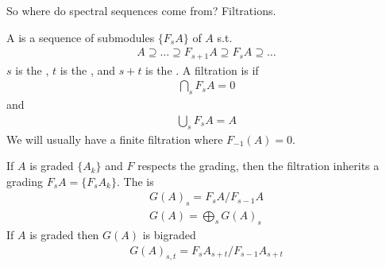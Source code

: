 \documentclass[12pt,class=article,crop=false]{standalone}
\begin{document}
So where do spectral sequences come from? Filtrations.

\begin{defn}
A   is a sequence of submodules $ \{F_sA\} $ of $ A$  s.t.\ 
\begin{align*}
	A \supseteq \ldots \supseteq F_{s+1} A \supseteq F_s A \supseteq \ldots
\end{align*}
$ s$ is the  , $ t$ is the  , and $ s+t$ is the  .   
A filtration is \allbold{convergent}  if
\begin{align*}
	\bigcap_{ s} F_sA = 0 
\end{align*}
and
\begin{align*}
	\bigcup_{ s} F_s A =A 
\end{align*}
We will usually have a finite filtration where $ F_{-1}(A) = 0$.

If $ A$ is graded  $ \{A_k\} $ and $ F$ respects the grading,  then the filtration inherits a grading $ F_sA = \{F_s A_k\} $. The  is
\begin{align*}
	G(A)_s = F_sA / F_{s-1}A\\
	G(A) = \bigoplus_{ s} G(A)_s 
\end{align*}
If $ A$ is graded then  $ G(A)$ is bigraded
 \begin{align*}
	G(A)_{s,t} = F_s A_{s+t} / F_{s-1} A_{s+t}
\end{align*}
\end{defn}
\end{document}
